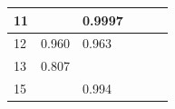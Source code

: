\begin{longtable}{l|l|l|l|l|l}
11 &                                                                                                         & 0.9997                                                                                                                                                                                                                                    &                                                                                                        &                                                                                                        &                                                                                                     \\ \hline
12 & 0.960                                                                                                   & 0.963                                                                                                                                                                                                                                     &                                                                                                        &                                                                                                        &                                                                                                     \\ \hline
13 & 0.807                                                                                                   &                                                                                                                                                                                                                                           &                                                                                                        &                                                                                                        &                                                                                                     \\ \hline
15 &                                                                                                         & 0.994                                                                                                                                                                                                                                     &                                                                                                        &                                                                                                        &                                                                                                     \\ \hline

\end{longtable}
